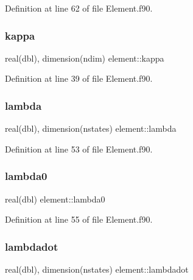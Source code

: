 Definition at line 62 of file Element.\+f90.

\mbox{\label{namespaceelement_ad5ea7346491c313bb4094d1838fe747e}} 
\subsubsection{\texorpdfstring{kappa}{kappa}}
{\footnotesize\ttfamily real(dbl), dimension(ndim) element\+::kappa\hspace{0.3cm}{\ttfamily [private]}}



Definition at line 39 of file Element.\+f90.

\mbox{\label{namespaceelement_abfc6a3777c98caf9d75aa0fa4ce97e17}} 
\subsubsection{\texorpdfstring{lambda}{lambda}}
{\footnotesize\ttfamily real(dbl), dimension(nstates) element\+::lambda\hspace{0.3cm}{\ttfamily [private]}}



Definition at line 53 of file Element.\+f90.

\mbox{\label{namespaceelement_aa9695f47555869b8d547d0d87d49275e}} 
\subsubsection{\texorpdfstring{lambda0}{lambda0}}
{\footnotesize\ttfamily real(dbl) element\+::lambda0\hspace{0.3cm}{\ttfamily [private]}}



Definition at line 55 of file Element.\+f90.

\mbox{\label{namespaceelement_a627873fe5856f3a9c95039d8f6877039}} 
\subsubsection{\texorpdfstring{lambdadot}{lambdadot}}
{\footnotesize\ttfamily real(dbl), dimension(nstates) element\+::lambdadot\hspace{0.3cm}{\ttfamily [private]}}



